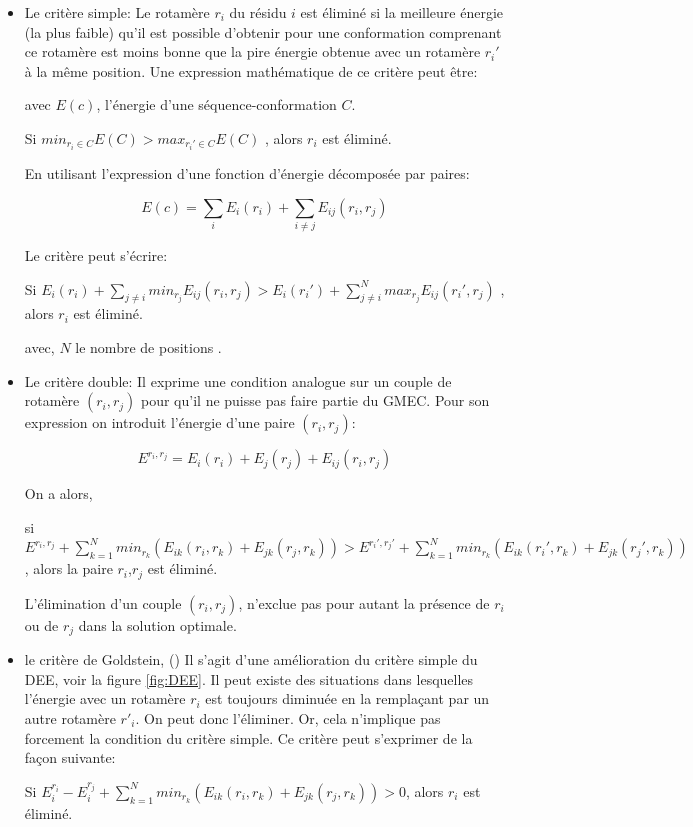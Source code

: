 \begin{itemize}
\item Le critère simple:
  Le rotamère $r_i$ du résidu $i$ est éliminé si la meilleure énergie (la plus faible) qu'il est possible d'obtenir pour une conformation comprenant ce rotamère est moins bonne que la pire énergie obtenue avec un rotamère $r_i'$  à la même position.
Une expression mathématique de ce critère peut être:

avec $E(c)$, l'énergie d'une séquence-conformation $C$.

Si $min_{r_i \in C }E(C) > max_{r_i' \in C} E(C)$ , alors $r_i$ est éliminé. 

En utilisant l'expression d'une fonction d'énergie décomposée par paires:

\begin{equation}
E(c) = \sum_i E_i (r_i) + \sum_{i\neq j} E_{ij} (r_i, r_j)
\end{equation}

Le critère peut s'écrire:

Si   $E_i(r_i) + \sum_{j\neq i} min_{r_j} E_{ij}(r_i,r_j) > E_i(r_i') + \sum_{j\neq i}^{N} max_{r_j}E_{ij}(r_i',r_j)$ , alors $r_i$ est éliminé. 

avec, $N$ le nombre de positions .


\item Le critère double:
  Il exprime une condition analogue sur un couple de rotamère $(r_i,r_j)$ pour qu'il ne puisse pas faire partie du GMEC. Pour son expression on introduit l'énergie d'une paire $(r_i,r_j)$:

\begin{equation}

 E^{r_i,r_j} = E_i(r_i) + E_j(r_j) + E_{ij}(r_i,r_j)  
\end{equation}

On a alors,


si $E^{r_i,r_j} + \sum_{k=1}^N min_{r_k} (E_{ik}(r_i,r_k) + E_{jk}(r_j,r_k)) >  E^{r_i',r_j'} + \sum_{k=1}^N min_{r_k} (E_{ik}(r_i',r_k) + E_{jk}(r_j',r_k))$ , alors la paire $r_i$,$r_j$ est éliminé.

L'élimination d'un couple $(r_i,r_j)$, n'exclue pas pour autant la présence de $r_i$ ou de $r_j$ dans la solution optimale. 

\item le critère de Goldstein, (\cite{Goldstein94}) 
  Il s'agit d'une amélioration du critère simple du DEE, voir la figure \ref{fig:DEE}. Il peut existe des situations dans lesquelles l'énergie avec un rotamère $r_i$  est toujours diminuée en la remplaçant par un autre rotamère $r'_i$. On peut donc l'éliminer. Or, cela n'implique pas forcement la condition du critère simple. Ce critère peut s'exprimer de la façon suivante:

Si $E_i^{r_i} - E_i^{r_j}+ \sum_{k=1}^N min_{r_k} (E_{ik}(r_i,r_k) + E_{jk}(r_j,r_k)) > 0$, alors $r_i$ est éliminé.

\end{itemize}

